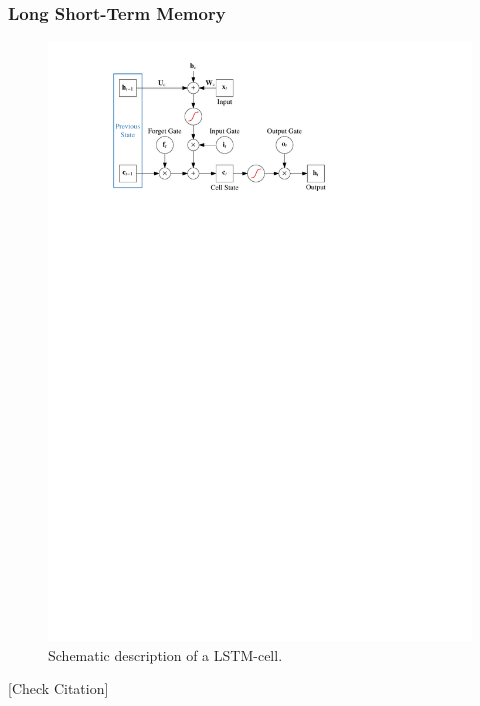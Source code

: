 \subsubsection{Long Short-Term Memory}
\label{sec:lstm}

\begin{figure}[t]
  \centering
  \includegraphics{./figures/theory/LSTM.pdf}
  \caption{Schematic description of a LSTM-cell.}
  \label{fig:schematic_lstm}
\end{figure}

[Check Citation]\cite{lstm}


